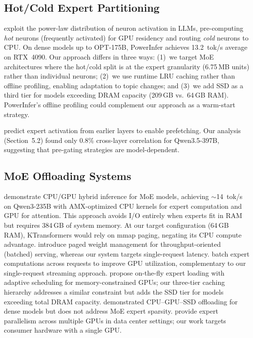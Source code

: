 \documentclass[10pt]{article}
\begin{document}
\subsection{Hot/Cold Expert Partitioning}

\citet{powerinfer} exploit the power-law distribution of neuron activation in LLMs, pre-computing \emph{hot} neurons (frequently activated) for GPU residency and routing \emph{cold} neurons to CPU. On dense models up to OPT-175B, PowerInfer achieves 13.2~tok/s average on RTX~4090. Our approach differs in three ways: (1)~we target MoE architectures where the hot/cold split is at the expert granularity (6.75\,MB units) rather than individual neurons; (2)~we use runtime LRU caching rather than offline profiling, enabling adaptation to topic changes; and (3)~we add SSD as a third tier for models exceeding DRAM capacity (209\,GB vs.\ 64\,GB RAM). PowerInfer's offline profiling could complement our approach as a warm-start strategy.

\citet{pregated} predict expert activation from earlier layers to enable prefetching. Our analysis (Section~5.2) found only 0.8\% cross-layer correlation for Qwen3.5-397B, suggesting that pre-gating strategies are model-dependent.

\subsection{MoE Offloading Systems}

\citet{ktransformers} demonstrate CPU/GPU hybrid inference for MoE models, achieving $\sim$14~tok/s on Qwen3-235B with AMX-optimized CPU kernels for expert computation and GPU for attention. This approach avoids I/O entirely when experts fit in RAM but requires 384\,GB of system memory. At our target configuration (64\,GB RAM), KTransformers would rely on mmap paging, negating its CPU compute advantage. \citet{moelightning} introduce paged weight management for throughput-oriented (batched) serving, whereas our system targets single-request latency. \citet{moegen} batch expert computations across requests to improve GPU utilization, complementary to our single-request streaming approach. \citet{floe} propose on-the-fly expert loading with adaptive scheduling for memory-constrained GPUs; our three-tier caching hierarchy addresses a similar constraint but adds the SSD tier for models exceeding total DRAM capacity. \citet{flexgen} demonstrated CPU--GPU--SSD offloading for dense models but does not address MoE expert sparsity. \citet{deepspeedmoe} provide expert parallelism across multiple GPUs in data center settings; our work targets consumer hardware with a single GPU.
\end{document}
